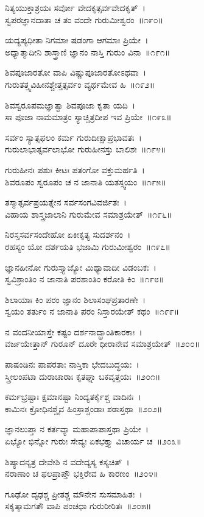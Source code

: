 ನಿತ್ಯಯುಕ್ತಾಶ್ರಯಃ ಸರ್ವೋ ವೇದಕೃತ್ಸರ್ವವೇದಕೃತ್~।\\
ಸ್ವಪರಜ್ಞಾನದಾತಾ ಚ ತಂ ವಂದೇ ಗುರುಮೀಶ್ವರಂ~॥೧೯೦॥

ಯದ್ಯಪ್ಯಧೀತಾ ನಿಗಮಾಃ ಷಡಂಗಾ ಆಗಮಾಃ ಪ್ರಿಯೇ~।\\
ಅಧ್ಯಾತ್ಮಾದೀನಿ ಶಾಸ್ತ್ರಾಣಿ ಜ್ಞಾನಂ ನಾಸ್ತಿ ಗುರುಂ ವಿನಾ~॥೧೯೧॥

ಶಿವಪೂಜಾರತೋ ವಾಪಿ ವಿಷ್ಣುಪೂಜಾರತೋಽಥವಾ~।\\
ಗುರುತತ್ತ್ವವಿಹೀನಶ್ಚೇತ್ತತ್ಸರ್ವಂ ವ್ಯರ್ಥಮೇವ ಹಿ~॥೧೯೨॥

ಶಿವಸ್ವರೂಪಮಜ್ಞಾತ್ವಾ ಶಿವಪೂಜಾ ಕೃತಾ ಯದಿ~।\\
ಸಾ ಪೂಜಾ ನಾಮಮಾತ್ರಂ ಸ್ಯಾಚ್ಚಿತ್ರದೀಪ ಇವ ಪ್ರಿಯೇ~॥೧೯೩॥

ಸರ್ವಂ ಸ್ಯಾತ್ಸಫಲಂ ಕರ್ಮ ಗುರುದೀಕ್ಷಾಪ್ರಭಾವತಃ~।\\
ಗುರುಲಾಭಾತ್ಸರ್ವಲಾಭೋ ಗುರುಹೀನಸ್ತು ಬಾಲಿಶಃ~॥೧೯೪॥

ಗುರುಹೀನಃ ಪಶುಃ ಕೀಟಃ ಪತಂಗೋ ವಕ್ತುಮರ್ಹತಿ~।\\
ಶಿವರೂಪಂ ಸ್ವರೂಪಂ ಚ ನ ಜಾನಾತಿ ಯತಸ್ಸ್ವಯಂ~॥೧೯೫॥

ತಸ್ಮಾತ್ಸರ್ವಪ್ರಯತ್ನೇನ ಸರ್ವಸಂಗವಿವರ್ಜಿತಃ~।\\
ವಿಹಾಯ ಶಾಸ್ತ್ರಜಾಲಾನಿ ಗುರುಮೇವ ಸಮಾಶ್ರಯೇತ್~॥೧೯೬॥

ನಿರಸ್ತಸರ್ವಸಂದೇಹೋ ಏಕೀಕೃತ್ಯ ಸುದರ್ಶನಂ~।\\
ರಹಸ್ಯಂ ಯೋ ದರ್ಶಯತಿ ಭಜಾಮಿ ಗುರುಮೀಶ್ವರಂ~॥೧೯೭॥

ಜ್ಞಾನಹೀನೋ ಗುರುಸ್ತ್ಯಾಜ್ಯೋ ಮಿಥ್ಯಾವಾದೀ ವಿಡಂಬಕಃ~।\\
ಸ್ವವಿಶ್ರಾಂತಿಂ ನ ಜಾನಾತಿ ಪರಶಾಂತಿಂ ಕರೋತಿ ಕಿಂ~॥೧೯೮॥

ಶಿಲಾಯಾಃ ಕಿಂ ಪರಂ ಜ್ಞಾನಂ ಶಿಲಾಸಂಘಪ್ರತಾರಣೇ~।\\
ಸ್ವಯಂ ತರ್ತುಂ ನ ಜಾನಾತಿ ಪರಂ ನಿಸ್ತಾರಯೇತ್ ಕಥಂ~॥೧೯೯॥

ನ ವಂದನೀಯಾಸ್ತೇ ಕಷ್ಟಂ ದರ್ಶನಾದ್ಭ್ರಾಂತಿಕಾರಕಾಃ~।\\
ವರ್ಜಯೇತ್ತಾನ್ ಗುರೂನ್ ದೂರೇ ಧೀರಾನೇವ ಸಮಾಶ್ರಯೇತ್~॥೨೦೦॥

ಪಾಷಂಡಿನಃ ಪಾಪರತಾಃ ನಾಸ್ತಿಕಾ ಭೇದಬುದ್ಧಯಃ~।\\
ಸ್ತ್ರೀಲಂಪಟಾ ದುರಾಚಾರಾಃ ಕೃತಘ್ನಾ ಬಕವೃತ್ತಯಃ~॥೨೦೧॥

ಕರ್ಮಭ್ರಷ್ಟಾಃ ಕ್ಷಮಾನಷ್ಟಾ ನಿಂದ್ಯತರ್ಕೈಶ್ಚ ವಾದಿನಃ~।\\
ಕಾಮಿನಃ ಕ್ರೋಧಿನಶ್ಚೈವ ಹಿಂಸ್ರಾಶ್ಚಂಡಾಃ ಶಠಾಸ್ತಥಾ~॥೨೦೨॥

ಜ್ಞಾನಲುಪ್ತಾ ನ ಕರ್ತವ್ಯಾ ಮಹಾಪಾಪಾಸ್ತಥಾ ಪ್ರಿಯೇ~।\\
ಏಭ್ಯೋ ಭಿನ್ನೋ ಗುರುಃ ಸೇವ್ಯಃ ಏಕಭಕ್ತ್ಯಾ ವಿಚಾರ್ಯ ಚ~॥೨೦೩॥

ಶಿಷ್ಯಾದನ್ಯತ್ರ ದೇವೇಶಿ ನ ವದೇದ್ಯಸ್ಯ ಕಸ್ಯಚಿತ್~।\\
ನರಾಣಾಂ ಚ ಫಲಪ್ರಾಪ್ತೌ ಭಕ್ತಿರೇವ ಹಿ ಕಾರಣಂ~॥೨೦೪॥

ಗೂಢೋ ದೃಢಶ್ಚ ಪ್ರೀತಶ್ಚ ಮೌನೇನ ಸುಸಮಾಹಿತಃ~।\\
ಸಕೃತ್ಕಾಮಗತೌ ವಾಪಿ ಪಂಚಧಾ ಗುರುರೀರಿತಃ~॥೨೦೫॥

